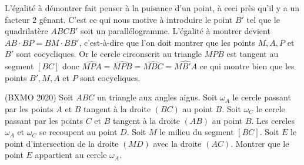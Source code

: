 \begin{sol}
\begin{center}
\end{center}

L'égalité à démontrer fait penser à la puisance d'un point, à ceci près qu'il y a un facteur $2$ gênant. C'est ce qui nous motive à introduire le point $B'$ tel que le quadrilatère $ABCB'$ soit un parallélogramme. L'égalité à montrer devient $AB \cdot BP= BM\cdot BB'$, c'est-à-dire que l'on doit montrer que les points $M,A,P$ et $B'$ sont cocycliques. Or le cercle circonscrit au triangle $MPB$ est tangent au segment $[BC]$ donc $\widehat{MPA}=\widehat{MPB}=\widehat{MBC}=\widehat{MB'A}$ ce qui montre bien que les points $B',M, A$ et $P$ sont cocycliques.
\end{sol}


\begin{exo}
(BXMO 2020) Soit $ABC$ un triangle aux angles aigus. Soit $\omega_A$ le cercle passant par les points $A$ et $B$ tangent à la droite $(BC)$ au point $B$. Soit $\omega_C$ le cercle passant par les points $C$ et $B$ tangent à la droite $(AB)$ au point $B$. Les cercles $\omega_A$ et $\omega_C$ se recoupent au point $D$. Soit $M$ le milieu du segment $[BC]$. Soit $E$ le point d'intersection de la droite $(MD)$ avec la droite $(AC)$. Montrer que le point $E$ appartient au cercle $\omega_A$.
\end{exo}


